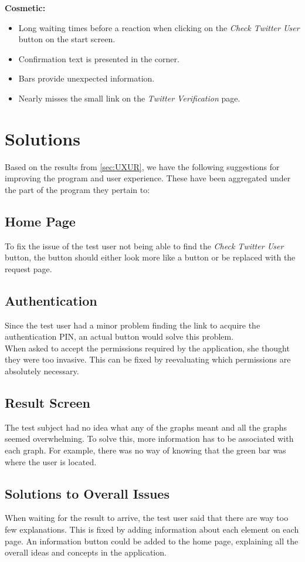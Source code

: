 \textbf{Cosmetic:}
\begin{itemize}
  \item Long waiting times before a reaction when clicking on the \textit{Check
  Twitter User} button on the start screen.
  \item Confirmation text is presented in the corner.
  \item Bars provide unexpected information.
  \item Nearly misses the small link on the \textit{Twitter Verification} page.
\end{itemize}

\section{Solutions}
Based on the results from \autoref{sec:UXUR}, we have the following suggestions
for improving the program and user experience. These have been aggregated under
the part of the program they pertain to:

\subsection*{Home Page} To fix the issue of the test user not being able to find
the \textit{Check Twitter User} button, the button should either look more like
a button or be replaced with the request page.

\subsection*{Authentication}
Since the test user had a minor problem finding the link to acquire the
authentication PIN, an actual button would solve this problem.\\
When asked to accept the permissions required by the application, she thought
they were too invasive. This can be fixed by reevaluating which permissions
are absolutely necessary.

\subsection*{Result Screen}
The test subject had no idea what any of the graphs meant and all the graphs
seemed overwhelming. To solve this, more information has to be
associated with each graph. For example, there was no way of knowing that the
green bar was where the user is located. 

\subsection*{Solutions to Overall Issues}
When waiting for the result to arrive, the test user said that there are way too
few explanations. This is fixed by adding information about each element
on each page. An information button could be added to the home page, explaining
all the overall ideas and concepts in the application.
